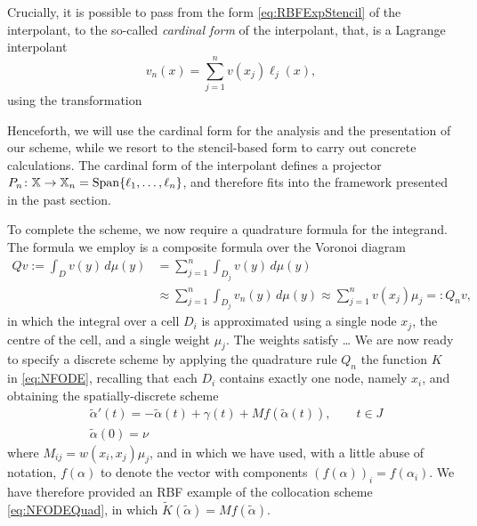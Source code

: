 \documentclass[a4paper]{siamart190516}
\begin{document}
Crucially, it is possible to pass from the form \cref{eq:RBFExpStencil} of the
interpolant, to the so-called \textit{cardinal form} of the interpolant, that, is a
Lagrange interpolant
\[
  v_n(x) = \sum_{j=1}^{n} v(x_j) \ell_j(x),
\]
using the transformation

Henceforth, we will use the cardinal form for the analysis and the presentation of
our scheme, while we resort to the stencil-based form to carry out concrete
calculations. The cardinal form of the interpolant defines a projector $P_n \colon \mathbb{X} \to
\mathbb{X}_n = \operatorname{Span} \{ \ell_1, \ldots, \ell_n \}$, and therefore fits into the framework
presented in the past section.

To complete the scheme, we now require a quadrature formula for the integrand. The
formula we employ is a composite formula over the Voronoi diagram
\[
  \begin{aligned}
  Q v := \int_{D} v(y)\,d \mu(y) 
    & = \sum_{j=1}^n \int_{D_j} v(y) \,d \mu(y) \\
    & \approx \sum_{j = 1}^n \int_{D_j} v_n(y) \,d \mu(y)
      \approx \sum_{j = 1}^n v(x_j) \mu_j =: Q_n v,
  \end{aligned}
\]
in which the integral over a cell $D_i$ is approximated using a single node $x_j$,
the centre of the cell, and a single weight $\mu_j$. The weights satisfy \ldots
{} We are now ready to specify a discrete scheme by applying the quadrature rule $Q_n$
the function $K$ in \cref{eq:NFODE}, recalling that each $D_i$ contains exactly
one node, namely $x_i$, and obtaining the spatially-discrete scheme
\[
  \begin{aligned}
  & \tilde \alpha'(t) = -\tilde \alpha(t) + \gamma(t) 
    + M f(\tilde \alpha(t)), \qquad t \in J \\
  & \tilde \alpha(0) = \nu
  \end{aligned}
\]
where $M_{ij} = w(x_i,x_j)\mu_j$, and in which we have used, with a little abuse of
notation, $f(\alpha)$ to denote the vector with components $(f(\alpha))_i =
f(\alpha_i)$. We have therefore provided an RBF example of the collocation scheme
\cref{eq:NFODEQuad}, in which $\tilde K(\tilde \alpha) = M f(\tilde \alpha)$.



\end{document}
